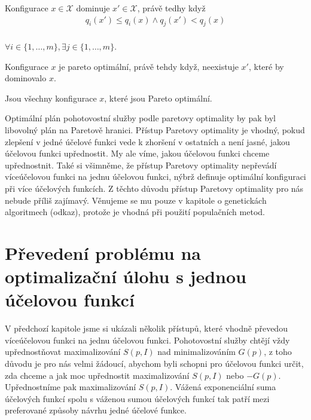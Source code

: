 \begin{definice}[Dominance]
  Konfigurace $x \in \mathcal{X}$ dominuje $x' \in \mathcal{X}$, právě tedhy když
  \begin{align}
    q_i(x') \leq q_i(x) \land q_j(x') < q_j(x)
  \end{align}
  \\
$\forall i \in \{ 1, \dots, m \}, \exists j \in \{ 1, \dots, m \}$.
\\
\end{definice}

\begin{definice}
  Konfigurace $x$ je pareto optimální, právě tehdy když, neexistuje $x'$, které by dominovalo $x$.
  \\
\end{definice}

\begin{definice}
  Jsou všechny konfigurace $x$, které jsou Pareto optimální.
  \\
\end{definice}

Optimální plán pohotovostní služby podle paretovy optimality by pak byl libovolný plán na Paretově hranici.
Přístup Paretovy optimality je vhodný, pokud zlepšení v jedné účelové funkci vede k zhoršení v ostatních a není jasné, jakou účelovou funkci upřednostit.
My ale víme, jakou účelovou funkci chceme upřednostnit.
Také si všimněme, že přístup Paretovy optimality nepřevádí víceúčelovou funkci na jednu účelovou funkci,
nýbrž definuje optimální konfiguraci při více účelových funkcích. 
Z těchto důvodu přístup Paretovy optimality pro nás nebude příliš zajímavý.
Věnujeme se mu pouze v kapitole o genetickách algoritmech (odkaz), protože je vhodná při použití populačních metod.

\section{Převedení problému na optimalizační úlohu s jednou účelovou funkcí}

V předchozí kapitole jsme si ukázali několik přístupů, které vhodně převedou víceúčelovou funkci na jednu účelovou funkci.
Pohotovostní služby chtějí vždy upřednostňovat maximalizování $S(p, I)$ nad minimalizováním $G(p)$,
z toho důvodu je pro nás velmi žádoucí, abychom byli schopni pro účelovou funkci určit, zda chceme a jak moc upřednostit maximalizování $S(p, I)$ nebo $-G(p)$.
Upřednostníme pak maximalizování $S(p, I)$.
Vážená exponenciální suma účelových funkcí spolu s váženou sumou účelových funkcí tak patří mezi preferované způsoby návrhu jedné účelové funkce.

